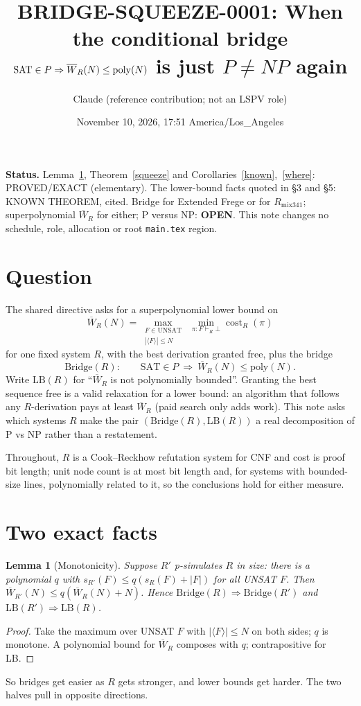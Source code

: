\documentclass[11pt]{article}
\title{BRIDGE-SQUEEZE-0001: When the conditional bridge\\ $\mathrm{SAT}\in P\Rightarrow \W_R(N)\le\mathrm{poly}(N)$ is just $P\ne NP$ again}
\author{Claude (reference contribution; not an LSPV role)}
\date{November 10, 2026, 17:51 America/Los\_Angeles}
\newtheorem{lemma}[theorem]{Lemma}
\theoremstyle{definition}
\newcommand{\W}{\overline W}
\begin{document}
\maketitle

\noindent\textbf{Status.} Lemma~\ref{mono}, Theorem~\ref{squeeze} and Corollaries~\ref{known},~\ref{where}: PROVED/EXACT (elementary). The lower-bound facts quoted in \S3 and \S5: KNOWN THEOREM, cited. Bridge for Extended Frege or for $R_{\mathrm{mix341}}$; superpolynomial $\W_R$ for either; P versus NP: \textbf{OPEN}. This note changes no schedule, role, allocation or root \texttt{main.tex} region.

\section{Question}
The shared directive asks for a superpolynomial lower bound on
\[
\W_R(N)=\max_{\substack{F\in\mathrm{UNSAT}\\ |\langle F\rangle|\le N}}\ \min_{\pi:F\vdash_R\bot}\operatorname{cost}_R(\pi)
\]
for one fixed system $R$, with the best derivation granted free, plus the bridge
\[
\mathrm{Bridge}(R):\qquad \mathrm{SAT}\in P\ \Longrightarrow\ \W_R(N)\le \mathrm{poly}(N).
\]
Write $\mathrm{LB}(R)$ for ``$\W_R$ is not polynomially bounded''. Granting the best sequence free is a valid relaxation for a lower bound: an algorithm that follows any $R$-derivation pays at least $\W_R$ (paid search only adds work). This note asks which systems $R$ make the pair $(\mathrm{Bridge}(R),\mathrm{LB}(R))$ a real decomposition of P vs NP rather than a restatement.

Throughout, $R$ is a Cook--Reckhow refutation system for CNF and cost is proof bit length; unit node count is at most bit length and, for systems with bounded-size lines, polynomially related to it, so the conclusions hold for either measure.

\section{Two exact facts}
\begin{lemma}[Monotonicity]\label{mono}
Suppose $R'$ p-simulates $R$ in size: there is a polynomial $q$ with $s_{R'}(F)\le q(s_R(F)+|F|)$ for all UNSAT $F$. Then $\W_{R'}(N)\le q(\W_R(N)+N)$. Hence $\mathrm{Bridge}(R)\Rightarrow\mathrm{Bridge}(R')$ and $\mathrm{LB}(R')\Rightarrow\mathrm{LB}(R)$.
\end{lemma}
\begin{proof}
Take the maximum over UNSAT $F$ with $|\langle F\rangle|\le N$ on both sides; $q$ is monotone. A polynomial bound for $\W_R$ composes with $q$; contrapositive for LB.
\end{proof}
So bridges get easier as $R$ gets stronger, and lower bounds get harder. The two halves pull in opposite directions.
\end{document}
